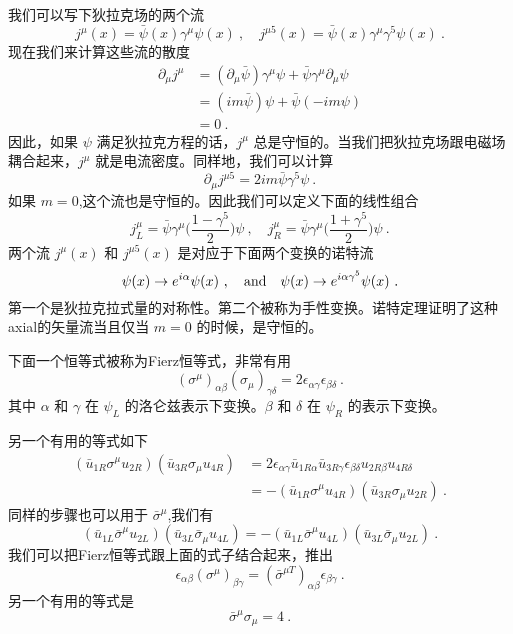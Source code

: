 我们可以写下狄拉克场的两个流
\begin{equation}
j^\mu(x) = \bar\psi(x)\gamma^\mu\psi(x)~, \quad j^{\mu 5}(x) = \bar\psi(x)\gamma^\mu\gamma^5\psi(x)~.
\end{equation}
现在我们来计算这些流的散度
\begin{align}\nonumber
\partial_\mu j^\mu & = (\partial_\mu \bar\psi)\gamma^\mu\psi + \bar\psi\gamma^\mu\partial_\mu\psi \\\nonumber
& = (im \bar\psi) \psi + \bar\psi(-i m \psi)\\
& = 0 ~.
\end{align}
因此，如果 $\psi$ 满足狄拉克方程的话，$j^\mu$ 总是守恒的。当我们把狄拉克场跟电磁场耦合起来，$j^\mu$ 就是电流密度。同样地，我们可以计算
\begin{equation}
\partial_\mu j^{\mu 5} = 2 i m \bar\psi \gamma^5 \psi ~.
\end{equation}
如果 $m=0$,这个流也是守恒的。因此我们可以定义下面的线性组合
\begin{equation}
j^\mu_L = \bar \psi \gamma^\mu \bigg( \frac{1-\gamma^5}{2} \bigg)\psi ~, \quad j^\mu_R = \bar \psi \gamma^\mu \bigg( \frac{1+\gamma^5}{2} \bigg)\psi ~.
\end{equation}
两个流 $j^\mu(x)$ 和 $j^{\mu 5}(x)$ 是对应于下面两个变换的诺特流
\begin{equation}
\psi(x) \rightarrow e^{i\alpha} \psi(x) ~, \quad {\rm and} \quad \psi(x)\rightarrow e^{i\alpha\gamma^5}\psi(x)~.
\end{equation}
第一个是狄拉克拉式量的对称性。第二个被称为手性变换。诺特定理证明了这种axial的矢量流当且仅当 $m=0$ 的时候，是守恒的。

下面一个恒等式被称为Fierz恒等式，非常有用
\begin{equation}
(\sigma^\mu)_{\alpha\beta}(\sigma_\mu)_{\gamma\delta} = 2 \epsilon_{\alpha\gamma} \epsilon_{\beta\delta}~.
\end{equation}
其中 $\alpha$ 和 $\gamma$ 在 $\psi_L$ 的洛仑兹表示下变换。$\beta$ 和 $\delta$ 在 $\psi_R$ 的表示下变换。

另一个有用的等式如下
\begin{align}\nonumber
(\bar u_{1R}\sigma^\mu u_{2R})(\bar u_{3R}\sigma_{\mu}u_{4R}) & = 2 \epsilon_{\alpha\gamma} \bar u_{1R\alpha} \bar u_{3R\gamma} \epsilon_{\beta\delta } u_{2 R \beta} u_{4 R \delta }\\
& = - (\bar u_{1R} \sigma^\mu u_{4R})(\bar u_{3R}\sigma_\mu u_{2R})~.
\end{align}
同样的步骤也可以用于 $\bar\sigma^\mu$,我们有
\begin{equation}
(\bar u_{1L}\bar \sigma^\mu u_{2L})(\bar u_{3L}\bar \sigma_\mu u_{4L}) = -(\bar u_{1L}\bar \sigma^\mu u_{4L} )(\bar u_{3L}\bar \sigma_\mu u_{2L})~.
\end{equation}
我们可以把Fierz恒等式跟上面的式子结合起来，推出
\begin{equation}
\epsilon_{\alpha\beta}(\sigma^\mu)_{\beta\gamma} = (\bar \sigma^{\mu T})_{\alpha \beta} \epsilon_{\beta\gamma}~.
\end{equation}
另一个有用的等式是
\begin{equation}
\bar \sigma^\mu \sigma_\mu = 4~.
\end{equation}



